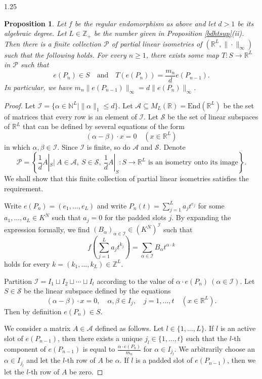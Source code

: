 \documentclass[12pt]{article}
\newtheorem{proposition}[definition]{Proposition}
\begin{document}
\begin{spacing}{1.25}
\begin{proposition}\label{supevolve}
Let $f$ be the regular endomorphism as above and let $d>1$ be its algebraic degree. Let $L\in\mathbb{Z}_+$ be the number given in Proposition \ref{bdhtsup}(ii). Then there is a finite collection $\mathcal{P}$ of partial linear isometries of $(\mathbb{R}^L,\|\cdot\|_{\infty})$ such that the following holds. For every $n\geq1$, there exists some map $T\colon S\to\mathbb{R}^L$ in $\mathcal{P}$ such that
$$
e(P_n)\in S\quad\text{and}\quad T(e(P_n))=\frac{m_n}{d}e(P_{n-1}).
$$
In particular, we have $m_n\|e(P_{n-1})\|_{\infty}=d\|e(P_n)\|_{\infty}$.
\end{proposition}

\begin{proof}
Let $\mathcal{I}=\{\alpha\in\mathbb{N}^L\mid\|\alpha\|_1\leq d\}$. Let $\mathcal{A}\subseteq M_L(\mathbb{R})=\mathrm{End}(\mathbb{R}^L)$ be the set of matrices that every row is an element of $\mathcal{I}$. Let $\mathcal{S}$ be the set of linear subspaces of $\mathbb{R}^L$ that can be defined by several equations of the form
$$
(\alpha-\beta)\cdot x=0\quad(x\in\mathbb{R}^L)
$$
in which $\alpha,\beta\in\mathcal{I}$. Since $\mathcal{I}$ is finite, so do $\mathcal{A}$ and $\mathcal{S}$. Denote
$$
\mathcal{P}=\left\{\frac{1}{d}A|_{S}\bigg|\ A\in\mathcal{A},\ S\in\mathcal{S},\ \frac{1}{d}A|_{S}\colon S\to\mathbb{R}^L\text{ is an isometry onto its image}\right\}.
$$
We shall show that this finite collection of partial linear isometries satisfies the requirement.

Write $e(P_n)=(e_1,\dots,e_L)$ and write $P_n(t)=\sum\limits_{j=1}^L a_jt^{e_j}$ for some $a_1,\dots,a_L\in K^N$ such that $a_j=0$ for the padded slots $j$. By expanding the expression formally, we find $(B_{\alpha})_{\alpha\in\mathcal{I}}\in(K^N)^{\mathcal{I}}$ such that
$$
f\left(\sum\limits_{j=1}^L a_jt^{k_j}\right)=\sum\limits_{\alpha\in\mathcal{I}}B_{\alpha}t^{\alpha\cdot k}
$$
holds for every $k=(k_1,\dots,k_L)\in\mathbb{Z}^L$.

Partition $\mathcal{I}=I_1\sqcup I_2\sqcup\cdots\sqcup I_t$ according to the value of $\alpha\cdot e(P_n)\ (\alpha\in\mathcal{I})$. Let $S\in\mathcal{S}$ be the linear subspace defined by the equations
$$
(\alpha-\beta)\cdot x=0,\quad\alpha,\beta\in I_j,\quad j=1,\dots,t\quad(x\in\mathbb{R}^L).
$$
Then by definition $e(P_n)\in S$.

We consider a matrix $A\in\mathcal{A}$ defined as follows. Let $l\in\{1,\dots,L\}$. If $l$ is an active slot of $e(P_{n-1})$, then there exists a unique $j_l\in\{1,\dots,t\}$ such that the $l$-th component of $e(P_{n-1})$ is equal to $\frac{\alpha\cdot e(P_n)}{m_n}$ for $\alpha\in I_{j_l}$. We arbitrarily choose an $\alpha\in I_{j_l}$ and let the $l$-th row of $A$ be $\alpha$. If $l$ is a padded slot of $e(P_{n-1})$, then we let the $l$-th row of $A$ be zero.


\end{proof}
\end{spacing}
\end{document}
